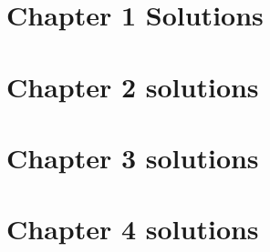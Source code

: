 \documentclass{article}
\begin{document}
\section{Chapter 1 Solutions}

\newpage

\section{Chapter 2 solutions}
\label{sec:chapter-2-solutions}


%


%

%

%

%

%

%

%

%


%

%

%

%

%

%

%


\newpage
\section{Chapter 3 solutions}


\newpage
\section{Chapter 4 solutions}

\end{document}
